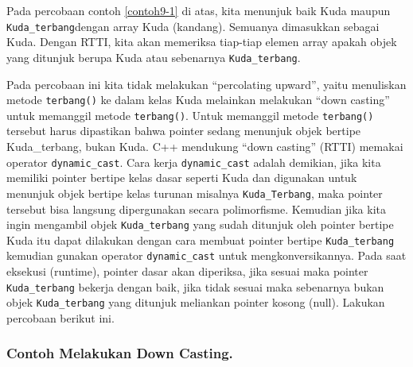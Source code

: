 Pada percobaan contoh \ref{contoh9-1} di atas, kita menunjuk baik Kuda maupun
\texttt{Kuda\_terbang}dengan array Kuda (kandang). Semuanya dimasukkan
sebagai Kuda. Dengan RTTI, kita akan memeriksa tiap-tiap elemen array
apakah objek yang ditunjuk berupa Kuda atau sebenarnya
\texttt{Kuda\_terbang}.

Pada percobaan ini kita tidak melakukan ``percolating upward'', yaitu
menuliskan metode \texttt{terbang()} ke dalam kelas Kuda melainkan
melakukan ``down casting'' untuk memanggil metode \texttt{terbang()}.
Untuk memanggil metode \texttt{terbang()} tersebut harus dipastikan
bahwa pointer sedang menunjuk objek bertipe Kuda\_terbang, bukan Kuda.
C++ mendukung ``down casting'' (RTTI) memakai operator
\texttt{dynamic\_cast}. Cara kerja \texttt{dynamic\_cast} adalah
demikian, jika kita memiliki pointer bertipe kelas dasar seperti Kuda
dan digunakan untuk menunjuk objek bertipe kelas turunan misalnya
\texttt{Kuda\_Terbang}, maka pointer tersebut bisa langsung dipergunakan
secara polimorfisme. Kemudian jika kita ingin mengambil objek
\texttt{Kuda\_terbang} yang sudah ditunjuk oleh pointer bertipe Kuda itu
dapat dilakukan dengan cara membuat pointer bertipe
\texttt{Kuda\_terbang} kemudian gunakan operator \texttt{dynamic\_cast}
untuk mengkonversikannya. Pada saat eksekusi (runtime), pointer dasar
akan diperiksa, jika sesuai maka pointer \texttt{Kuda\_terbang} bekerja
dengan baik, jika tidak sesuai maka sebenarnya bukan objek
\texttt{Kuda\_terbang} yang ditunjuk meliankan pointer kosong (null).
Lakukan percobaan berikut ini.

\subsubsection*{Contoh  Melakukan Down Casting.}

